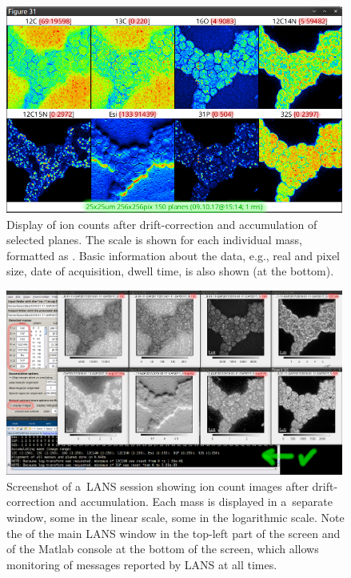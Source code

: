 
\begin{figure}[!ht]
\centering
\includegraphics[width=0.99\textwidth]{figs3/LANS-display-accu-planes}
\caption{\label{fig:display-accu-planes}%
Display of ion counts after drift-correction and accumulation of selected planes. The scale is shown for each individual mass, formatted as . Basic information about the data, e.g., real and pixel size, date of acquisition, dwell time, is also shown (at the bottom).}
\end{figure}

\begin{figure}[!hb]
\centering
\includegraphics[width=0.99\textwidth]{figs3/LANS-display-masses}
\caption{\label{fig:display-masses}%
Screenshot of a~LANS session showing ion count images after drift-correction and accumulation. Each mass is displayed in a~separate window, some in the linear scale, some in the logarithmic scale. Note the  of the main LANS window in the top-left part of the screen and of the Matlab console at the bottom of the screen, which allows monitoring of messages reported by LANS at all times.}
\end{figure}

